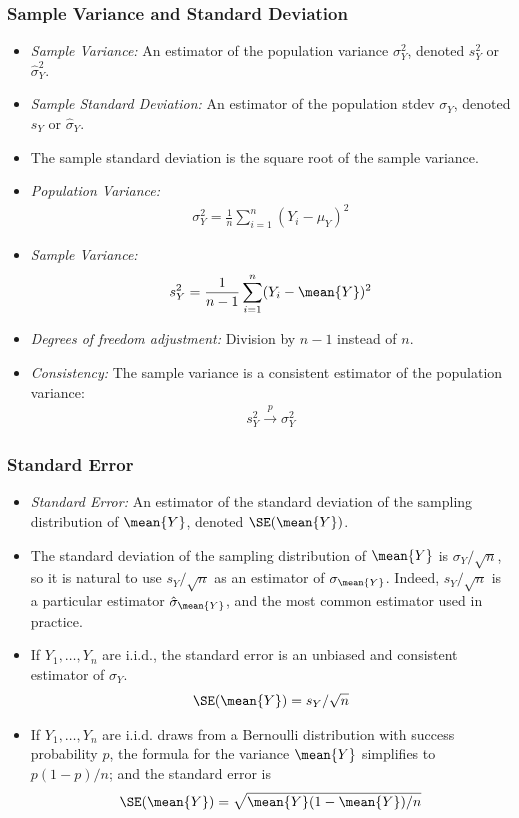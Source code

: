 \begin{frame}
\frametitle{Sample Variance and Standard Deviation}
\begin{itemize}
\item \emph{Sample Variance:} 
An estimator of the population variance $\sigma_Y^2$, denoted $s_Y^2$ or $\hat{\sigma}_Y^2$. 
\item \emph{Sample Standard Deviation:} 
An estimator of the population stdev $\sigma_Y$, denoted $s_Y$ or $\hat{\sigma}_Y$.
\item The sample standard deviation is the square root of the sample variance.
\item \emph{Population Variance:}
\begin{align*}
\sigma_Y^2 = \frac{1}{n} \sum_{i=1}^n (Y_i-\mu_Y)^2
\end{align*}
\item \emph{Sample Variance:}
\begin{align*}
s_Y^2 = \frac{1}{n-1} \sum_{i=1}^n (Y_i-\mean{Y})^2
\end{align*}
\item \emph{Degrees of freedom adjustment:} Division by $n-1$ instead of $n$.
\item \emph{Consistency:} The sample variance is a consistent estimator
of the population variance:
\begin{align*}
s_Y^2 \xrightarrow{p} \sigma_Y^2
\end{align*}
\end{itemize}
\end{frame}


\begin{frame}
\frametitle{Standard Error}
\begin{itemize}
\item \emph{Standard Error:} 
An estimator of the standard deviation of the sampling distribution of $\mean{Y}$, denoted $\SE(\mean{Y})$. 
\item The standard deviation of the sampling distribution of $\mean{Y}$ is $\sigma_Y/\sqrt{n}$, so it is natural to use $s_Y/\sqrt{n}$ as an estimator of $\sigma_{\mean{Y}}$. Indeed, $s_Y/\sqrt{n}$ is a particular estimator $\hat{\sigma}_{\mean{Y}}$, and the most common estimator used in practice.
\item If $Y_1,\ldots,Y_n$ are i.i.d., the standard error is an unbiased and consistent estimator of $\sigma_Y$. 
\begin{align*}
\SE(\mean{Y}) = s_Y/\sqrt{n}
\end{align*}
\item If $Y_1,\ldots,Y_n$ are i.i.d. draws from a Bernoulli distribution with success probability $p$, the formula for the variance $\mean{Y}$ simplifies to $p(1-p)/n$; and the standard error is
\begin{align*}
\SE(\mean{Y})=\sqrt{\mean{Y}(1-\mean{Y})/n}
\end{align*}
\end{itemize}
\end{frame}


